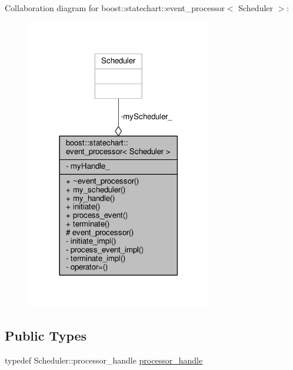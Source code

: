 Collaboration diagram for boost\+:\+:statechart\+:\+:event\+\_\+processor$<$ Scheduler $>$\+:
\nopagebreak
\begin{figure}[H]
\begin{center}
\leavevmode
\includegraphics[width=230pt]{classboost_1_1statechart_1_1event__processor__coll__graph}
\end{center}
\end{figure}
\subsection*{Public Types}
\begin{DoxyCompactItemize}
\item 
typedef Scheduler\+::processor\+\_\+handle \mbox{\hyperlink{classboost_1_1statechart_1_1event__processor_a0cb7488f303c3c79a6bd52b58ce43a2a}{processor\+\_\+handle}}
\end{DoxyCompactItemize}
